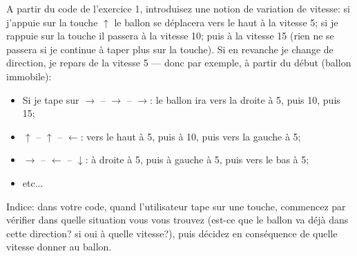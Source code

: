 \documentclass[11pt]{article}
\begin{document}
	\begin{MonExo}
		A partir du code de l'exercice 1, introduisez une notion de variation de vitesse: si j'appuie sur la touche $\uparrow$ le ballon se déplacera vers le haut à la vitesse 5; si je rappuie sur la touche il passera à la vitesse 10; puis à la vitesse 15 (rien ne se passera si je continue à taper plus sur la touche). Si en revanche je change de direction, je repars de la vitesse 5 --- donc par exemple, à partir du début (ballon immobile):
		\begin{itemize}
			\item Si je tape sur $\rightarrow$ -- $\rightarrow$ -- $\rightarrow$: le ballon ira vers la droite à 5, puis 10, puis 15;
			\item $\uparrow$ -- $\uparrow$ -- $\leftarrow$: vers le haut à 5, puis à 10, puis vers la gauche à 5;
			\item $\rightarrow$ -- $\leftarrow$ -- $\downarrow$: à droite à 5, puis à gauche à 5, puis vers le bas à 5;
			\item etc...
		\end{itemize}
		
		Indice: dans votre code, quand l'utilisateur tape sur une touche, commencez par vérifier dans quelle situation vous vous trouvez (est-ce que le ballon va déjà dans cette direction? si oui à quelle vitesse?), puis décidez en conséquence de quelle vitesse donner au ballon.
	\end{MonExo}
	
\end{document}
